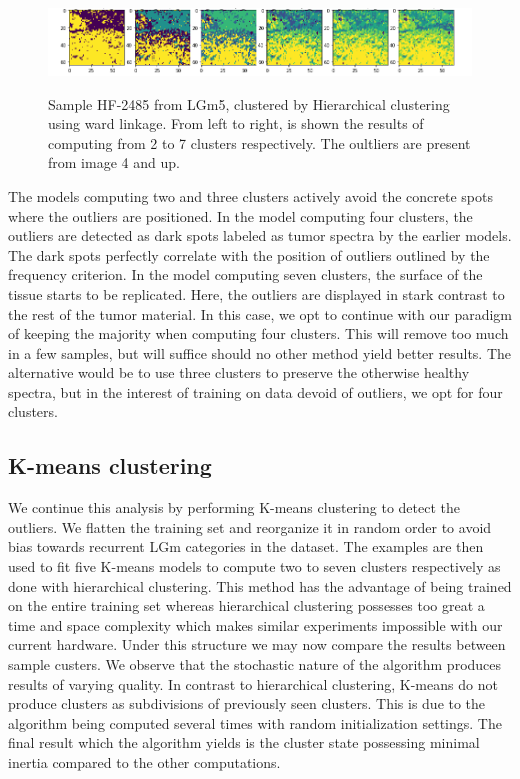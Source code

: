 \begin{figure}[h]

    \centering
{\includegraphics[width=15cm]{images/Ward_linkage/LGm-5/HF-2485_V1B_1.h5_9.png} }
\caption{Sample HF-2485 from LGm5, clustered by Hierarchical clustering using ward linkage. From left to right, is shown the results of computing from 2 to 7 clusters respectively. The oultliers are present from image 4 and up.
\label{fig:hf_2485}}%
\end{figure}

The models computing two and three clusters actively avoid the concrete spots where the outliers are positioned. In the model computing four clusters, the outliers are detected as dark spots labeled as tumor spectra by the earlier models. The dark spots perfectly correlate with the position of outliers outlined by the frequency criterion. In the model computing seven clusters, the surface of the tissue starts to be replicated. Here, the outliers are displayed in stark contrast to the rest of the tumor material. In this case, we opt to continue with our paradigm of keeping the majority when computing four clusters. This will remove too much in a few samples, but will suffice should no other method yield better results. The alternative would be to use three clusters to preserve the otherwise healthy spectra, but in the interest of training on data devoid of outliers, we opt for four clusters.

\subsection{K-means clustering}

We continue this analysis by performing K-means clustering to detect the outliers. We flatten the training set and reorganize it in random order to avoid bias towards recurrent LGm categories in the dataset. The examples are then used to fit five K-means models to compute two to seven clusters respectively as done with hierarchical clustering. This method has the advantage of being trained on the entire training set whereas hierarchical clustering possesses too great a time and space complexity which makes similar experiments impossible with our current hardware. Under this structure we may now compare the results between sample custers. We observe that the stochastic nature of the algorithm produces results of varying quality. In contrast to hierarchical clustering, K-means do not produce clusters as subdivisions of previously seen clusters. This is due to the algorithm being computed several times with random initialization settings. The final result which the algorithm yields is the cluster state possessing minimal inertia compared to the other computations.

